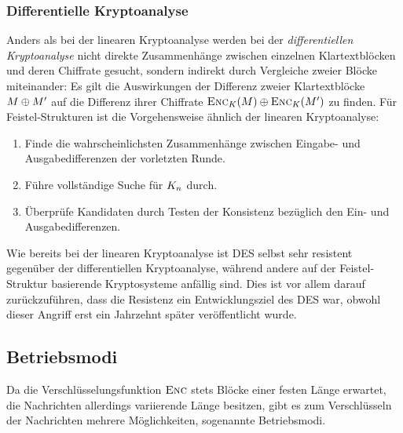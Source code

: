 \subsubsection{Differentielle Kryptoanalyse}
\label{sssec:diffKryptoanalyse}
Anders als bei der linearen Kryptoanalyse werden bei der \emph{differentiellen Kryptoanalyse} nicht direkte Zusammenhänge zwischen einzelnen Klartextblöcken und deren Chiffrate gesucht, sondern indirekt durch Vergleiche zweier Blöcke miteinander: Es gilt die Auswirkungen der Differenz zweier Klartextblöcke $M \oplus M'$ auf die Differenz ihrer Chiffrate $\textsc{Enc}_{K}(M) \oplus \textsc{Enc}_{K}(M')$ zu finden.
Für Feistel-Strukturen ist die Vorgehensweise ähnlich der linearen Kryptoanalyse:
\begin{enumerate}
	\item Finde die wahrscheinlichsten Zusammenhänge zwischen Eingabe- und Ausgabedifferenzen der vorletzten Runde.
	\item Führe vollständige Suche für $K_n$ durch.
	\item Überprüfe Kandidaten durch Testen der Konsistenz bezüglich den Ein- und Ausgabedifferenzen.
\end{enumerate}

Wie bereits bei der linearen Kryptoanalyse ist DES selbst sehr resistent gegenüber der differentiellen Kryptoanalyse, während andere auf der Feistel-Struktur basierende Kryptosysteme anfällig sind. Dies ist vor
allem darauf zurückzuführen, dass die Resistenz ein Entwicklungsziel des DES war, obwohl dieser Angriff erst ein Jahrzehnt später veröffentlicht wurde.

\subsection{Betriebsmodi}
Da die Verschlüsselungsfunktion $\textsc{Enc}$ stets Blöcke einer festen Länge erwartet, die Nachrichten allerdings variierende Länge besitzen, gibt es zum Verschlüsseln der Nachrichten mehrere Möglichkeiten, sogenannte Betriebsmodi.

